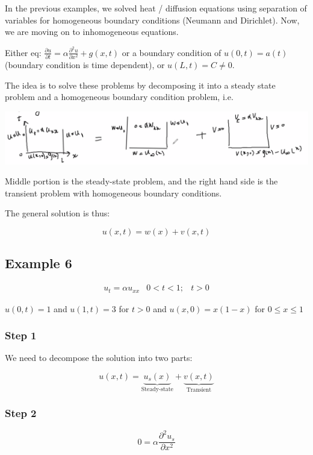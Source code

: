 In the previous examples, we solved heat / diffusion equations using separation of variables for homogeneous boundary conditions (Neumann and Dirichlet). Now, we are moving on to inhomogeneous equations. 

Either eq: $\frac{\partial u}{\partial t} = \alpha \frac{\partial^2 u}{\partial x^2} + g(x,t)$ or a boundary condition of $u(0,t) = a(t)$ (boundary condition is time dependent), or $u(L,t) = C \neq 0$. 

The idea is to solve these problems by decomposing it into a steady state problem and a homogeneous boundary condition problem, i.e. 

\includegraphics[width = 0.95 \textwidth]{image2.png}

Middle portion is the steady-state problem, and the right hand side is the transient problem with homogeneous boundary conditions. 

The general solution is thus:

$$u(x,t) = w(x) + v(x,t)$$

\subsection{Example 6}

$$\begin{matrix} u_t = \alpha u_{xx} & 0 < t < 1; & t > 0 \end{matrix}$$

$u(0,t) = 1$ and $u(1,t) = 3$ for $t > 0$ and $u(x,0) = x(1-x)$ for $0 \leq x \leq 1$

\subsubsection{Step 1}

We need to decompose the solution into two parts:

$$u(x,t) = \underbrace{u_s (x)}_{\text{Steady-state}} + \underbrace{v(x,t)}_{\text{Transient}}$$

\subsubsection{Step 2}

$$0 = \alpha \frac{\partial^2 u_s}{\partial x^2}$$

